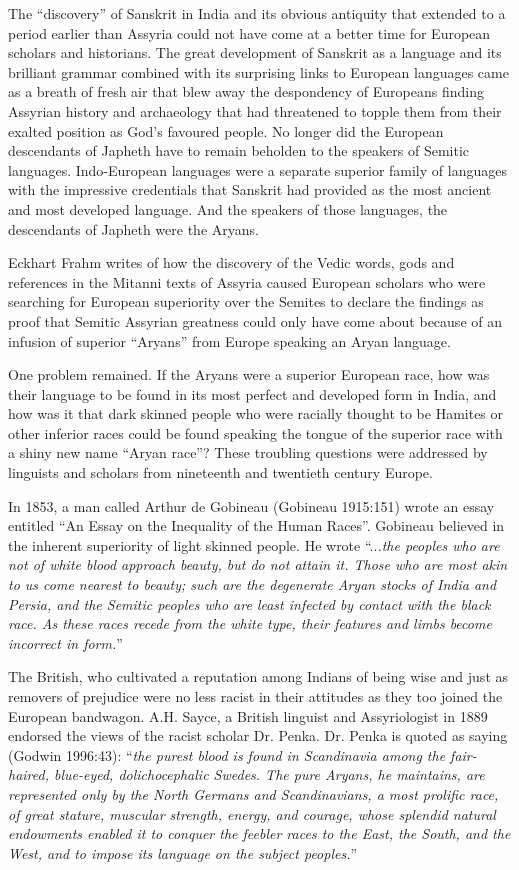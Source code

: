 The “discovery” of Sanskrit in India and its obvious antiquity that extended to a period earlier than Assyria could not have come at a better time for European scholars and historians. The great development of Sanskrit as a language and its brilliant grammar combined with its surprising links to European languages came as a breath of fresh air that blew away the despondency of Europeans finding Assyrian history and archaeology that had threatened to topple them from their exalted position as God's favoured people. No longer did the European descendants of Japheth have to remain beholden to the speakers of Semitic languages. Indo-European languages were a separate superior family of languages with the impressive credentials that Sanskrit had provided as the most ancient and most developed language. And the speakers of those languages, the descendants of Japheth were the Aryans.

Eckhart Frahm writes of how the discovery of the Vedic words, gods and references in the Mitanni texts of Assyria caused European scholars who were searching for European superiority over the Semites to declare the findings as proof that Semitic Assyrian greatness could only have come about because of an infusion of superior “Aryans” from Europe speaking an Aryan language.

One problem remained. If the Aryans were a superior European race, how was their language to be found in its most perfect and developed form in India, and how was it that dark skinned people who were racially thought to be Hamites or other inferior races could be found speaking the tongue of the superior race with a shiny new name “Aryan race”? These troubling questions were addressed by linguists and scholars from nineteenth and twentieth century Europe.

In 1853, a man called Arthur de Gobineau (Gobineau 1915:151) wrote an essay entitled “An Essay on the Inequality of the Human Races”. Gobineau believed in the inherent superiority of light skinned people. He wrote “..\textit{.the peoples who are not of white blood approach beauty, but do not attain it. Those who are most akin to us come nearest to beauty; such are the degenerate Aryan stocks of India and Persia, and the Semitic peoples who are least infected by contact with the black race. As these races recede from the white type, their features and limbs become incorrect in form.}”

The British, who cultivated a reputation among Indians of being wise and just as removers of prejudice were no less racist in their attitudes as they too joined the European bandwagon. A.H. Sayce, a British linguist and Assyriologist in 1889 endorsed the views of the racist scholar Dr. Penka. Dr. Penka is quoted as saying (Godwin 1996:43): “\textit{the purest blood is found in Scandinavia among the fair-haired, blue-eyed, dolichocephalic Swedes. The pure Aryans, he maintains, are represented only by the North Germans and Scandinavians, a most prolific race, of great stature, muscular strength, energy, and courage, whose splendid natural endowments enabled it to conquer the feebler races to the East, the South, and the West, and to impose its language on the subject peoples.}”

